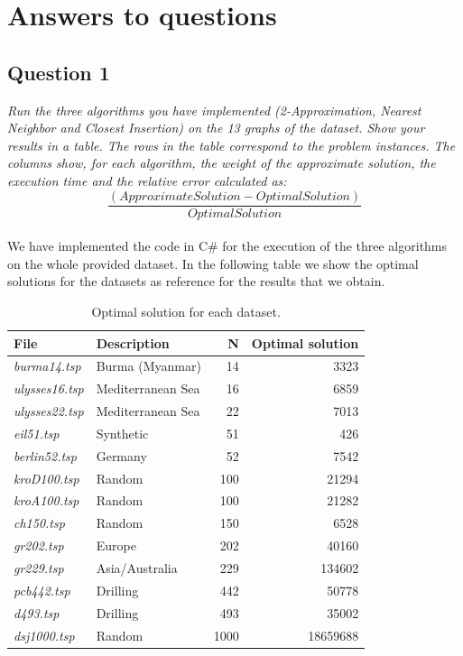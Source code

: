 \section{Answers to questions}

\subsection{Question 1}
\textit{Run the three algorithms you have implemented (2-Approximation, Nearest Neighbor and Closest Insertion) on the 13 graphs of the dataset. Show your results in a table. The rows in the table correspond to the problem instances. The columns show, for each algorithm, the weight of the approximate solution, the execution time and the relative error calculated as:
\[\frac{(ApproximateSolution - OptimalSolution)}{OptimalSolution}\]}\\

\noindent
We have implemented the code in C\# for the execution of the three algorithms on the whole provided dataset.
In the following table we show the optimal solutions for the datasets as reference for the results that we obtain.
\begin{table}[H]\centering
    \begin{tabular}{|l|l|r|r|}
    \hline
    \textbf{File} & \textbf{Description} & \textbf{N} & \textbf{Optimal solution} \\
    \hline
    \textit{burma14.tsp}	    & Burma (Myanmar)	& 14	& 3323 \\
    \textit{ulysses16.tsp}      & Mediterranean Sea & 16	& 6859 \\
    \textit{ulysses22.tsp}      & Mediterranean Sea & 22	& 7013 \\
    \textit{eil51.tsp}          & Synthetic	        & 51	& 426 \\
    \textit{berlin52.tsp}	    & Germany	        & 52 	& 7542 \\
    \textit{kroD100.tsp}	    & Random	        & 100	& 21294 \\
    \textit{kroA100.tsp}	    & Random 	        & 100	& 21282 \\
    \textit{ch150.tsp}	        & Random	        & 150	& 6528 \\
    \textit{gr202.tsp}	        & Europe	        & 202   & 40160 \\
    \textit{gr229.tsp}	        & Asia/Australia	& 229	& 134602 \\
    \textit{pcb442.tsp}         & Drilling		    & 442 	& 50778 \\
    \textit{d493.tsp}	        & Drilling	        & 493	& 35002 \\
    \textit{dsj1000.tsp}	    & Random	        & 1000 	& 18659688 \\
    \hline
    \end{tabular}
    \caption{Optimal solution for each dataset.}
\end{table}

